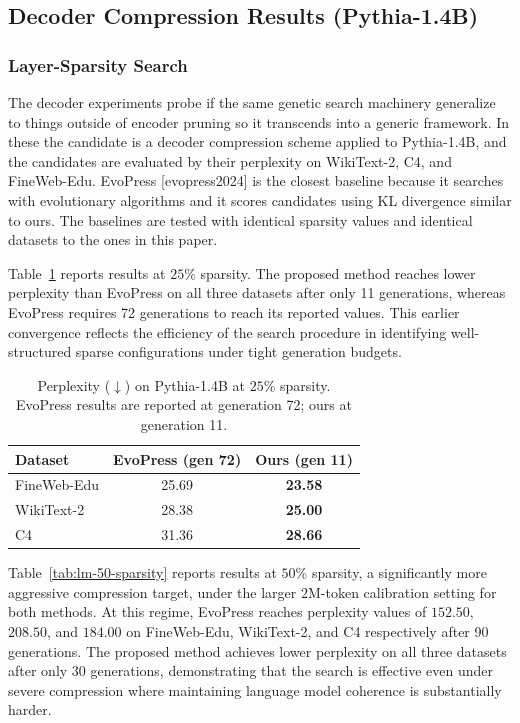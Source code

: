 \subsection{Decoder Compression Results (Pythia-1.4B)}
\label{subsec:lm-results}

\subsubsection{Layer-Sparsity Search}

The decoder experiments probe if the same genetic search machinery generalize to things outside of encoder pruning so it transcends into a generic framework. In these the candidate is a decoder compression scheme applied to Pythia-1.4B, and the candidates are evaluated by their perplexity on WikiText-2, C4, and FineWeb-Edu. EvoPress [evopress2024] is the closest baseline because it searches with evolutionary algorithms and it scores candidates using KL divergence similar to ours. The baselines are tested with identical sparsity values and identical datasets to the ones in this paper.

Table~\ref{tab:lm-25-sparsity} reports results at $25\%$ sparsity. The proposed method reaches lower perplexity than EvoPress on all three datasets after only 11 generations, whereas EvoPress requires 72 generations to reach its reported values. This earlier convergence reflects the efficiency of the search procedure in identifying well-structured sparse configurations under tight generation budgets.

\begin{table}[H]
\centering
\caption{Perplexity ($\downarrow$) on Pythia-1.4B at $25\%$ sparsity. EvoPress results are reported at generation 72; ours at generation 11.}
\label{tab:lm-25-sparsity}
\begin{tabular}{lcc}
  \toprule
  \textbf{Dataset} & \textbf{EvoPress (gen 72)} & \textbf{Ours (gen 11)} \\
  \midrule
  FineWeb-Edu & 25.69 & \textbf{23.58} \\
  WikiText-2  & 28.38 & \textbf{25.00} \\
  C4          & 31.36 & \textbf{28.66} \\
  \bottomrule
\end{tabular}
\end{table}

Table~\ref{tab:lm-50-sparsity} reports results at $50\%$ sparsity, a significantly more aggressive compression target, under the larger $2$M-token calibration setting for both methods. At this regime, EvoPress reaches perplexity values of $152.50$, $208.50$, and $184.00$ on FineWeb-Edu, WikiText-2, and C4 respectively after 90 generations. The proposed method achieves lower perplexity on all three datasets after only 30 generations, demonstrating that the search is effective even under severe compression where maintaining language model coherence is substantially harder.

